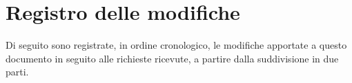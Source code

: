 \documentclass[11pt,a4paper]{report}
\begin{document}















\chapter*{Registro delle modifiche}

Di seguito sono registrate, in ordine cronologico, le modifiche apportate a
questo documento in seguito alle richieste ricevute, a partire dalla
suddivisione in due parti.
\end{document}
